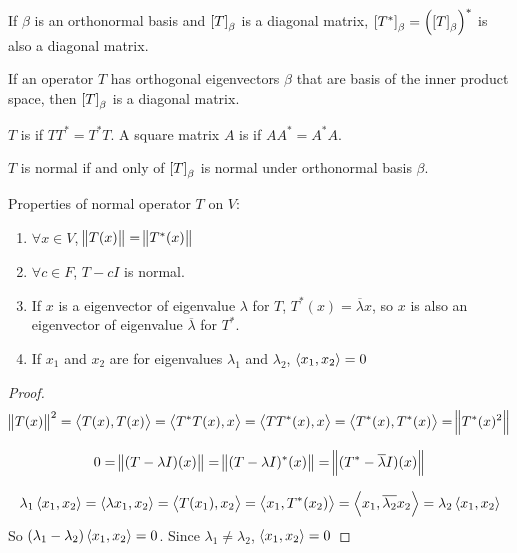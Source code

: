 \begin{theorem}
    If $\beta$ is an orthonormal basis and $\coordinate{T}_\beta$ is a diagonal matrix, $\coordinate{T^*}_\beta = \left(\coordinate{T}_\beta\right)^*$ is also a diagonal matrix.
\end{theorem}

\begin{theorem}
    If an operator $T$ has orthogonal eigenvectors $\beta$ that are basis of the inner product space, then $\coordinate{T}_\beta$ is a diagonal matrix.
\end{theorem}




\begin{definition}
    $T$ is  if $T T^* = T^* T$. A square matrix $A$ is  if $AA^* = A^* A$.
\end{definition}

\begin{theorem}
    $T$ is normal if and only of $\coordinate{T}_\beta$ is normal under orthonormal basis $\beta$.
\end{theorem}

\begin{theorem}\label{propertyofnormaloperator}
    Properties of normal operator $T$ on $V$:
    \begin{enumerate}
        \item $\forall x \in V$, $\norm{T(x)} = \norm{T^*(x)}$
        \item $\forall c \in F$, $T - cI$ is normal.
        \item If $x$ is a eigenvector of eigenvalue $\lambda$ for $T$, $T^*(x) = \overline{\lambda} x$, so $x$ is also an eigenvector of eigenvalue $\overline{\lambda}$ for $T^*$.
        \item If $x_1$ and $x_2$ are for eigenvalues $\lambda_1$ and $\lambda_2$, $\left\langle \displaystyle x_1, x_2 \right\rangle = 0$
    \end{enumerate}    
\end{theorem}
\begin{proof}
    \begin{equation*}
        \norm{T(x)}^2 = \left\langle \displaystyle T(x), T(x) \right\rangle = \left\langle \displaystyle T^* T (x), x \right\rangle = \left\langle \displaystyle TT^*(x), x \right\rangle = \left\langle \displaystyle T^*(x), T^*(x) \right\rangle = \norm{T^*(x)^2}
    \end{equation*}
    
    \begin{equation*}
        0 = \norm{(T - \lambda I)(x)} = \norm{(T - \lambda I)^*(x)} = \norm{(T^* - \overline{\lambda} I)(x) }
    \end{equation*}
    
    \begin{equation*}
        \lambda_1 \left\langle \displaystyle x_1, x_2 \right\rangle = \left\langle \displaystyle \lambda x_1, x_2 \right\rangle = \left\langle \displaystyle T(x_1), x_2 \right\rangle = \left\langle \displaystyle x_1, T^*(x_2) \right\rangle = \left\langle \displaystyle x_1, \overline{\lambda_2} x_2 \right\rangle = \lambda_2 \left\langle \displaystyle x_1, x_2 \right\rangle
    \end{equation*}
    So $(\lambda_1 - \lambda_2) \left\langle \displaystyle x_1, x_2 \right\rangle = 0$. Since $\lambda_1 \neq \lambda_2$, $\left\langle \displaystyle x_1, x_2 \right\rangle = 0$
\end{proof}


